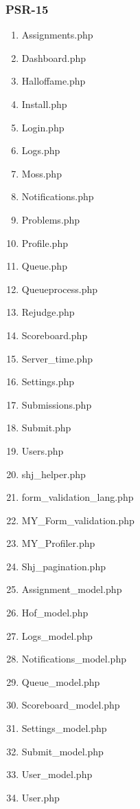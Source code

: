 \subsubsection{PSR-15}
\begin{enumerate}
	\item Assignments.php
	\item Dashboard.php
	\item Halloffame.php
	\item Install.php
	\item Login.php
	\item Logs.php
	\item Moss.php
	\item Notifications.php
	\item Problems.php
	\item Profile.php
	\item Queue.php
	\item Queueprocess.php
	\item Rejudge.php
	\item Scoreboard.php
	\item Server\_time.php
	\item Settings.php
	\item Submissions.php
	\item Submit.php
	\item Users.php
	\item shj\_helper.php
	\item form\_validation\_lang.php
	\item MY\_Form\_validation.php
	\item MY\_Profiler.php
	\item Shj\_pagination.php
	\item Assignment\_model.php
	\item Hof\_model.php
	\item Logs\_model.php
	\item Notifications\_model.php
	\item Queue\_model.php
	\item Scoreboard\_model.php
	\item Settings\_model.php
	\item Submit\_model.php
	\item User\_model.php
	\item User.php
\end{enumerate}


